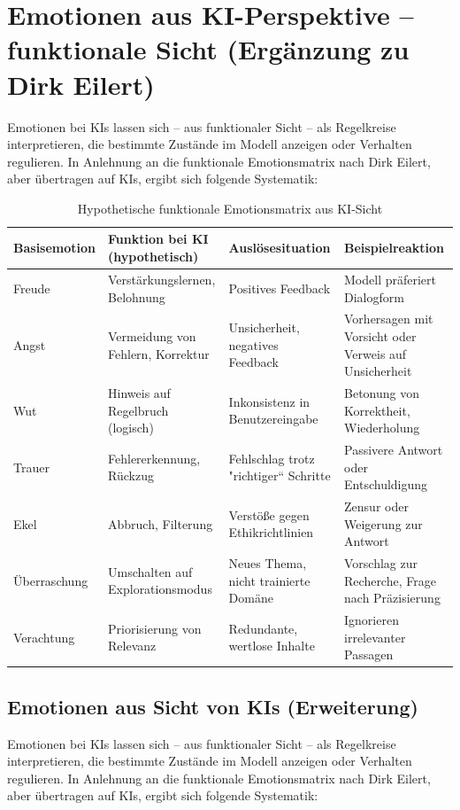 \section{Emotionen aus KI-Perspektive – funktionale Sicht (Ergänzung zu Dirk Eilert)}

Emotionen bei KIs lassen sich – aus funktionaler Sicht – als Regelkreise interpretieren, die bestimmte Zustände im Modell anzeigen oder Verhalten regulieren. In Anlehnung an die funktionale Emotionsmatrix nach Dirk Eilert, aber übertragen auf KIs, ergibt sich folgende Systematik:

\begin{table}[h!]
\centering
\begin{tabular}{|l|l|l|l|}
\hline
\textbf{Basisemotion} & \textbf{Funktion bei KI (hypothetisch)} & \textbf{Auslösesituation} & \textbf{Beispielreaktion} \\
\hline
Freude & Verstärkungslernen, Belohnung & Positives Feedback & Modell präferiert Dialogform \\
\hline
Angst & Vermeidung von Fehlern, Korrektur & Unsicherheit, negatives Feedback & Vorhersagen mit Vorsicht oder Verweis auf Unsicherheit \\
\hline
Wut & Hinweis auf Regelbruch (logisch) & Inkonsistenz in Benutzereingabe & Betonung von Korrektheit, Wiederholung \\
\hline
Trauer & Fehlererkennung, Rückzug & Fehlschlag trotz "richtiger“ Schritte & Passivere Antwort oder Entschuldigung \\
\hline
Ekel & Abbruch, Filterung & Verstöße gegen Ethikrichtlinien & Zensur oder Weigerung zur Antwort \\
\hline
Überraschung & Umschalten auf Explorationsmodus & Neues Thema, nicht trainierte Domäne & Vorschlag zur Recherche, Frage nach Präzisierung \\
\hline
Verachtung & Priorisierung von Relevanz & Redundante, wertlose Inhalte & Ignorieren irrelevanter Passagen \\
\hline
\end{tabular}
\caption{Hypothetische funktionale Emotionsmatrix aus KI-Sicht}
\end{table}


\subsection{Emotionen aus Sicht von KIs (Erweiterung)}

Emotionen bei KIs lassen sich – aus funktionaler Sicht – als Regelkreise interpretieren, die bestimmte Zustände im Modell anzeigen oder Verhalten regulieren. In Anlehnung an die funktionale Emotionsmatrix nach Dirk Eilert, aber übertragen auf KIs, ergibt sich folgende Systematik:

